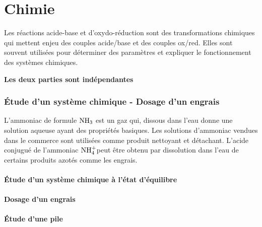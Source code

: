 \part{Chimie}
Les réactions acide-base et d'oxydo-réduction sont des transformations chimiques
qui mettent enjeu des couples acide/base et des couples ox/red. Elles sont
souvent utilisées pour déterminer des paramètres et expliquer le fonctionnement
des systèmes chimiques.

\begin{center}
    \textbf{Les deux parties sont indépendantes}
\end{center}

\section{Étude d'un système chimique - Dosage d'un engrais}
L'ammoniac de formule $\ce{NH3}$ est un gaz qui, dissous dans l'eau donne une
solution aqueuse ayant des propriétés basiques. Les solutions d'ammoniac vendues
dans le commerce sont utilisées comme produit nettoyant et détachant. L'acide
conjugué de l'ammoniac $\ce{NH$_{4}^{+}$}$peut être obtenu par dissolution dans
l'eau de certains produits azotés comme les engrais.

\subsection{Étude d'un système chimique à l'état d'équilibre}


\subsection{Dosage d'un engrais}


\subsection{Étude d'une pile}


